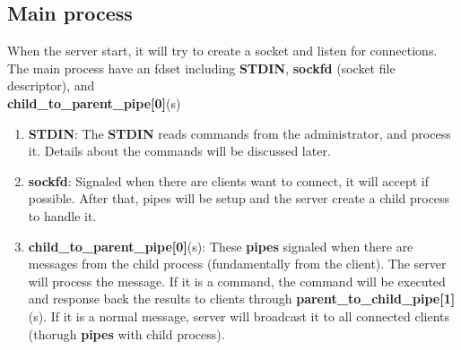 \documentclass[12pt]{article}
\begin{document}
\subsection{Main process}

When the server start, it will try to create a socket and listen for connections. The main process have an fdset including \textbf{STDIN}, \textbf{sockfd} (socket file descriptor), and\\\textbf{child\_to\_parent\_pipe[0]}(s)

\begin{enumerate}
\item \textbf{STDIN}: The \textbf{STDIN} reads commands from the administrator, and process it. Details about the commands will be discussed later.

\item \textbf{sockfd}: Signaled when there are clients want to connect, it will accept if possible. After that, pipes will be setup and the server create a child process to handle it.

\item \textbf{child\_to\_parent\_pipe[0]}(s): These \textbf{pipes} signaled when there are messages from the child process (fundamentally from the client). The server will process the message. If it is a command, the command will be executed and response back the results to clients through \textbf{parent\_to\_child\_pipe[1]}(s). If it is a normal message, server will broadcast it to all connected clients (thorugh \textbf{pipes} with child process).
\end{enumerate}








\end{document}

